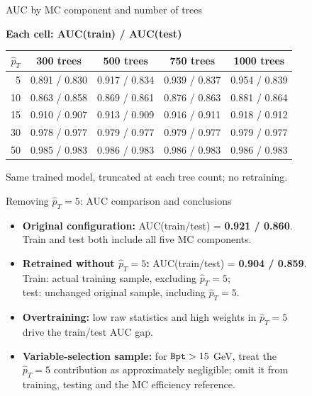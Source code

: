 \begin{frame}[label=p6_20260920]{AUC by MC component and number of trees}
\relax
\begin{center}
\textbf{Each cell: AUC(train) / AUC(test)}\par\vspace{0.800em}
{\small
\begin{tabular}{@{}rcccc@{}}\toprule
$\hat p_T$ & 300 trees & 500 trees & 750 trees & 1000 trees\\\midrule
5 & 0.891 / 0.830 & 0.917 / 0.834 & 0.939 / 0.837 & 0.954 / 0.839\\
10 & 0.863 / 0.858 & 0.869 / 0.861 & 0.876 / 0.863 & 0.881 / 0.864\\
15 & 0.910 / 0.907 & 0.913 / 0.909 & 0.916 / 0.911 & 0.918 / 0.912\\
30 & 0.978 / 0.977 & 0.979 / 0.977 & 0.979 / 0.977 & 0.979 / 0.977\\
50 & 0.985 / 0.983 & 0.986 / 0.983 & 0.986 / 0.983 & 0.986 / 0.983\\
\bottomrule\end{tabular}}
\end{center}
\vspace{0.500em}
Same trained model, truncated at each tree count; no retraining.
\end{frame}

\begin{frame}[label=p8_20260920]{Removing $\hat p_T=5$: AUC comparison and conclusions}
\begin{itemize}
  \setlength{\itemsep}{0.8em}
  \item \textbf{Original configuration:} AUC(train/test) = \textbf{0.921 / 0.860}.\\
        Train and test both include all five MC components.
  \item \textbf{Retrained without $\hat p_T=5$:} AUC(train/test) = \textbf{0.904 / 0.859}.\\
        Train: actual training sample, excluding $\hat p_T=5$;\\
        test: unchanged original sample, including $\hat p_T=5$.
  \item \textbf{Overtraining:} low raw statistics and high weights in $\hat p_T=5$\\
        drive the train/test AUC gap.
  \item \textbf{Variable-selection sample:} for $\var{Bpt}>15$ GeV, treat the\\
        $\hat p_T=5$ contribution as approximately negligible; omit it from\\
        training, testing and the MC efficiency reference.
\end{itemize}
\end{frame}


